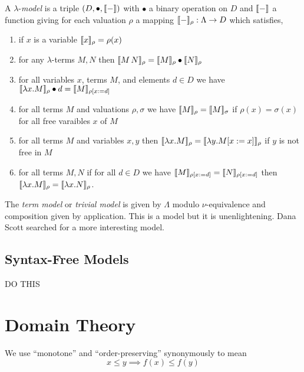 \documentclass[12pt]{article}
\begin{document}
\begin{defn}
A $\lambda$-\textit{model} is a triple $(D, \bullet, \llbracket - \rrbracket)$ with $\bullet$ a binary operation on $D$ and $\llbracket - \rrbracket$ a function giving for each valuation $\rho$ a mapping $\llbracket - \rrbracket_\rho : \Lambda \to D$ which satisfies,
\begin{enumerate}
\item if $x$ is a variable $\llbracket x \rrbracket_\rho = \rho(x)$
\item for any $\lambda$-terms $M, N$ then $\llbracket M \, N \rrbracket_\rho = \llbracket M \rrbracket_{\rho} \bullet \llbracket N \rrbracket_\rho$
\item for all variables $x$, terms $M$, and elements $d \in D$ we have $\llbracket \lambda x . M \rrbracket_\rho \bullet d = \llbracket M \rrbracket_{\rho [x := d]}$
\item for all terms $M$ and valuations $\rho, \sigma$ we have $\llbracket M \rrbracket_\rho = \llbracket M \rrbracket_\sigma$ if $\rho(x) = \sigma(x)$ for all free varaibles $x$ of $M$
\item for all terms $M$ and variables $x,y$ then $\llbracket \lambda x . M \rrbracket_\rho = \llbracket \lambda y . M [x := x] \rrbracket_{\rho}$ if $y$ is not free in $M$
\item for all terms $M, N$ if for all $d \in D$ we have $\llbracket M \rrbracket_{\rho [x := d]} = \llbracket N \rrbracket_{\rho [x := d]}$ then $\llbracket \lambda x . M \rrbracket_\rho = \llbracket \lambda x . N \rrbracket_\rho$.
\end{enumerate}
\end{defn}

\begin{rmk}
The \textit{term model} or \textit{trivial model} is given by $\Lambda$ modulo $\nu$-equivalence and composition given by application. This is a model but it is unenlightening. Dana Scott searched for a more interesting model. 
\end{rmk}

\subsection{Syntax-Free Models}

DO THIS

\section{Domain Theory}

\begin{rmk}
We use ``monotone'' and ``order-preserving'' synonymously to mean
\[ x \le y \implies f(x) \le f(y) \]
\end{rmk}
\end{document}
